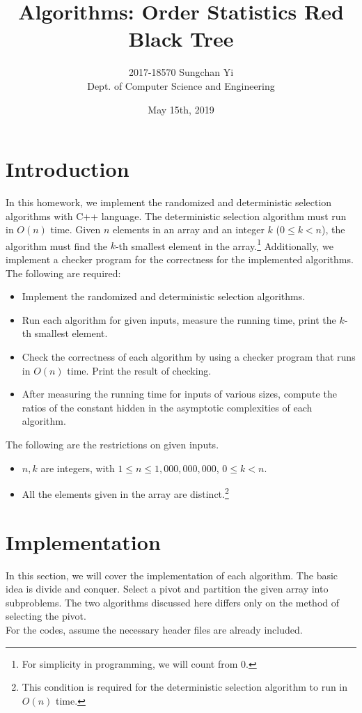 \documentclass[12pt]{article}
\title{\sffamily Algorithms: Order Statistics Red Black Tree}
\author{2017-18570 Sungchan Yi\\Dept. of Computer Science and Engineering}
\date{May 15th, 2019}
\begin{document}
 

\maketitle
\tableofcontents

\section{Introduction}
In this homework, we implement the randomized and deterministic selection algorithms with C++ language. The deterministic selection algorithm must run in $O(n)$ time. Given $n$ elements in an array and an integer $k$ ($0\leq k < n$), the algorithm must find the $k$-th smallest element in the array.\footnote{For simplicity in programming, we will count from 0.} Additionally, we implement a checker program for the correctness for the implemented algorithms. The following are required:
\begin{itemize}
	\item Implement the randomized and deterministic selection algorithms.
	\item Run each algorithm for given inputs, measure the running time, print the $k$-th smallest element.
	\item Check the correctness of each algorithm by using a checker program that runs in $O(n)$ time. Print the result of checking.
	\item After measuring the running time for inputs of various sizes, compute the ratios of the constant hidden in the asymptotic complexities of each algorithm.
\end{itemize}
The following are the restrictions on given inputs.
\begin{itemize}
	\item $n, k$ are integers, with $1\leq n\leq 1,000,000,000$, $0\leq k < n$.
	\item All the elements given in the array are distinct.\footnote{This condition is required for the deterministic selection algorithm to run in $O(n)$ time.}
\end{itemize}

\section{Implementation}
In this section, we will cover the implementation of each algorithm. The basic idea is divide and conquer. Select a pivot and partition the given array into subproblems. The two algorithms discussed here differs only on the method of selecting the pivot.\\
For the codes, assume the necessary header files are already included.
\end{document}
